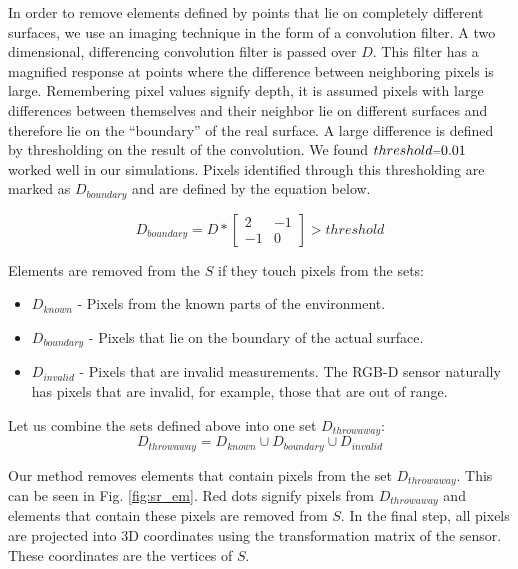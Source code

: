 In order to remove elements defined by points that lie on completely different
surfaces, we use an imaging technique in the form of a convolution filter. A two
dimensional, differencing convolution filter is passed over $D$. This filter has
a magnified response at points where the difference between neighboring pixels
is large. Remembering pixel values signify depth, it is assumed pixels with
large differences between themselves and their neighbor lie on different
surfaces and therefore lie on the ``boundary'' of the real surface. A large
difference is defined by thresholding on the result of the convolution. We found
$threshold\mathsmaller{=}0.01$ worked well in our simulations. Pixels identified
through this thresholding are marked as $D_{boundary}$ and are defined by the
equation below.

$$
D_{boundary} = D \ast \begin{bmatrix} 2 & -1 \\ -1 & 0 \end{bmatrix} > threshold
$$

Elements are removed from the $S$ if they touch pixels from the sets:
\begin{itemize}
  \item $D_{known}$ - Pixels from the known parts of the environment.
  \item $D_{boundary}$ - Pixels that lie on the boundary of the actual surface.
  \item $D_{invalid}$ -  Pixels that are invalid measurements. The RGB-D sensor
  naturally has pixels that are invalid, for example, those that are out of
  range.
\end{itemize}

Let us combine the sets defined above into one set $D_{throwaway}$:
$$
D_{throwaway} = D_{known} \cup D_{boundary} \cup D_{invalid}
$$

Our method removes elements that contain pixels from the set $D_{throwaway}$.
This can be seen in Fig. \ref{fig:sr_em}. Red dots signify pixels from
$D_{throwaway}$ and elements that contain these pixels are removed from $S$. In
the final step, all pixels are projected into 3D coordinates using the
transformation matrix of the sensor. These coordinates are the vertices of $S$.

